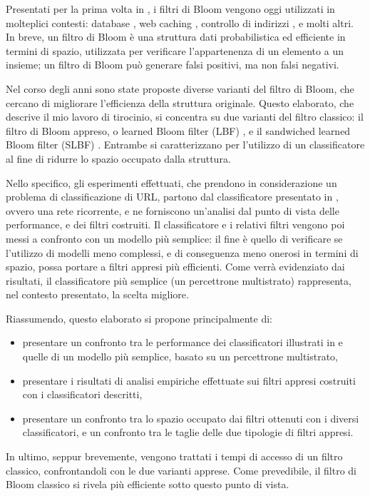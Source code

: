 \documentclass[../../main.tex]{subfiles}
\begin{document}
    
    Presentati per la prima volta in \cite{Bloom1970SpacetimeTI}, i filtri di Bloom vengono oggi utilizzati in molteplici contesti: database \cite{kraska2018case}, web caching \cite{Maggs15algorithmicnuggets}, controllo di indirizzi \cite{Dharmapurikar2006LongestPM}, e molti altri. In breve, un filtro di Bloom è una struttura dati probabilistica ed efficiente in termini di spazio, utilizzata per verificare l'appartenenza di un elemento a un insieme; un filtro di Bloom può generare falsi positivi, ma non falsi negativi.

    Nel corso degli anni sono state proposte diverse varianti del filtro di Bloom, che cercano di migliorare l'efficienza della struttura originale. Questo elaborato, che descrive il mio lavoro di tirocinio, si concentra su due varianti del filtro classico: il filtro di Bloom appreso, o learned Bloom filter (LBF) \cite{kraska2018case}, e il sandwiched learned Bloom filter (SLBF) \cite{10.5555/3326943.3326986}. Entrambe si caratterizzano per l'utilizzo di un classificatore al fine di ridurre lo spazio occupato dalla struttura.

    Nello specifico, gli esperimenti effettuati, che prendono in considerazione un problema di classificazione di URL, partono dal classificatore presentato in \cite{ma2020}, ovvero una rete ricorrente, e ne forniscono un'analisi dal punto di vista delle performance, e dei filtri costruiti. Il classificatore e i relativi filtri vengono poi messi a confronto con un modello più semplice: il fine è quello di verificare se l'utilizzo di modelli meno complessi, e di conseguenza meno onerosi in termini di spazio, possa portare a filtri appresi più efficienti. Come verrà evidenziato dai risultati, il classificatore più semplice (un percettrone multistrato) rappresenta, nel contesto presentato, la scelta migliore.

    Riassumendo, questo elaborato si propone principalmente di: 
    \begin{itemize}
        \item presentare un confronto tra le performance dei classificatori illustrati in \cite{ma2020} e quelle di un modello più semplice, basato su un percettrone multistrato,
        \item presentare i risultati di analisi empiriche effettuate sui filtri appresi costruiti con i classificatori descritti,
        \item presentare un confronto tra lo spazio occupato dai filtri ottenuti con i diversi classificatori, e un confronto tra le taglie delle due tipologie di filtri appresi.
    \end{itemize}
    In ultimo, seppur brevemente, vengono trattati i tempi di accesso di un filtro classico, confrontandoli con le due varianti apprese. Come prevedibile, il filtro di Bloom classico si rivela più efficiente sotto questo punto di vista. 
\end{document}
